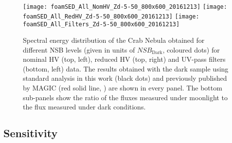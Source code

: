 \documentclass{PoS}
\begin{document}
\begin{figure}[t]
\texttt{[image: foamSED\_All\_NomHV\_Zd-5-50\_800x600\_20161213]}
\texttt{[image: foamSED\_All\_RedHV\_Zd-5-50\_800x600\_20161213]}
\texttt{[image: foamSED\_All\_Filters\_Zd-5-50\_800x600\_20161213]}
\caption{Spectral energy distribution of the Crab Nebula obtained for different NSB levels (given in units of $\textit{NSB}_{\text{Dark}}$, coloured dots)  for nominal HV (top, left), reduced HV (top, right) and UV-pass filters (bottom, left) data. The results obtained with the dark sample using standard analysis in this work (black dots) and previously published by MAGIC (red solid line, \cite{upgrade2}) are shown in every panel. The bottom sub-panels show the ratio of the fluxes measured under moonlight to the flux measured under dark conditions.}\label{fig:CrabSEDMoon}
\end{figure}



\subsection*{Sensitivity}
\end{document}
